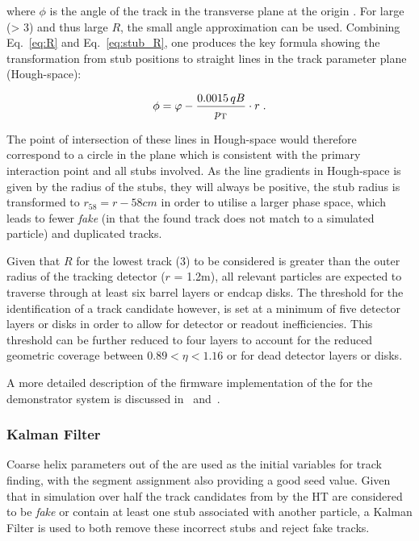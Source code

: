 where $\phi$ is the angle of the track in the transverse plane at the origin \cite{markthesis}. 
For large \pT (> 3\GeV) and thus large $R$, the small angle approximation can be used. Combining Eq.~\ref{eq:R} and Eq.~\ref{eq:stub_R}, one produces the key formula showing the transformation from stub positions to straight lines in the track parameter plane (Hough-space):

\begin{equation}
\phi = \varphi - \frac{0.0015\,qB}{p_{\mathrm{T}}}\cdot r \;.
\label{eq:localHT}
\end{equation}

The point of intersection of these lines in Hough-space would therefore correspond to a circle in the \rphi plane which is consistent with the primary interaction point and all stubs involved.
As the line gradients in Hough-space is given by the radius of the stubs, they will always be positive, the stub radius is transformed to $r_{58} = r - 58cm$ in order to utilise a larger phase space, which leads to fewer \textit{fake} (in that the found track does not match to a simulated particle) and duplicated tracks.

Given that $R$ for the lowest \pT track (3\GeV) to be considered is greater than the outer radius of the tracking detector ($r$ = 1.2m), all relevant particles are expected to traverse through at least six barrel layers or endcap disks. 
The threshold for the identification of a track candidate however, is set at a minimum of five detector layers or disks in order to allow for detector or readout inefficiencies. 
This threshold can be further reduced to four layers to account for the reduced geometric coverage between $0.89 < \eta < 1.16$ or for dead detector layers or disks.

A more detailed description of the firmware implementation of the \HT for the demonstrator system is discussed in~\cite{IEEE} and~\cite{TMTT_JINST}.

\subsubsection{Kalman Filter}\label{subsubsec:KF}
Coarse \rphi helix parameters out of the \HT are used as the initial variables for track finding, with the segment assignment also providing a good seed value.
Given that in simulation over half the track candidates from by the HT are considered to be \textit{fake} or contain at least one stub associated with another particle, a Kalman Filter is used to both remove these incorrect stubs and reject fake tracks. 

